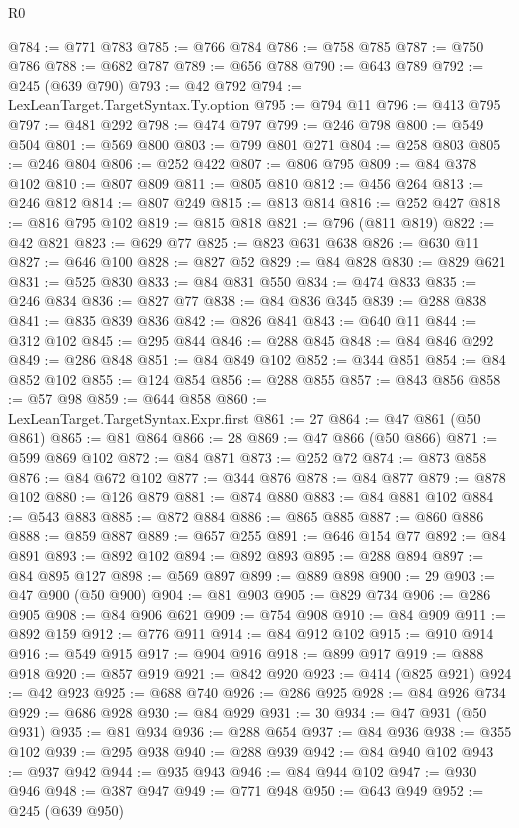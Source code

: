 \begin{lexlean}{R0}
\begin{coremodule}
@784 := @771 @783
@785 := @766 @784
@786 := @758 @785
@787 := @750 @786
@788 := @682 @787
@789 := @656 @788
@790 := @643 @789
@792 := @245 (@639 @790)
@793 := @42 @792
@794 := LexLeanTarget.TargetSyntax.Ty.option
@795 := @794 @11
@796 := @413 @795
@797 := @481 @292
@798 := @474 @797
@799 := @246 @798
@800 := @549 @504
@801 := @569 @800
@803 := @799 @801 @271
@804 := @258 @803
@805 := @246 @804
@806 := @252 @422
@807 := @806 @795
@809 := @84 @378 @102
@810 := @807 @809
@811 := @805 @810
@812 := @456 @264
@813 := @246 @812
@814 := @807 @249
@815 := @813 @814
@816 := @252 @427
@818 := @816 @795 @102
@819 := @815 @818
@821 := @796 (@811 @819)
@822 := @42 @821
@823 := @629 @77
@825 := @823 @631 @638
@826 := @630 @11
@827 := @646 @100
@828 := @827 @52
@829 := @84 @828
@830 := @829 @621
@831 := @525 @830
@833 := @84 @831 @550
@834 := @474 @833
@835 := @246 @834
@836 := @827 @77
@838 := @84 @836 @345
@839 := @288 @838
@841 := @835 @839 @836
@842 := @826 @841
@843 := @640 @11
@844 := @312 @102
@845 := @295 @844
@846 := @288 @845
@848 := @84 @846 @292
@849 := @286 @848
@851 := @84 @849 @102
@852 := @344 @851
@854 := @84 @852 @102
@855 := @124 @854
@856 := @288 @855
@857 := @843 @856
@858 := @57 @98
@859 := @644 @858
@860 := LexLeanTarget.TargetSyntax.Expr.first
@861 := 27
@864 := @47 @861 (@50 @861)
@865 := @81 @864
@866 := 28
@869 := @47 @866 (@50 @866)
@871 := @599 @869 @102
@872 := @84 @871
@873 := @252 @72
@874 := @873 @858
@876 := @84 @672 @102
@877 := @344 @876
@878 := @84 @877
@879 := @878 @102
@880 := @126 @879
@881 := @874 @880
@883 := @84 @881 @102
@884 := @543 @883
@885 := @872 @884
@886 := @865 @885
@887 := @860 @886
@888 := @859 @887
@889 := @657 @255
@891 := @646 @154 @77
@892 := @84 @891
@893 := @892 @102
@894 := @892 @893
@895 := @288 @894
@897 := @84 @895 @127
@898 := @569 @897
@899 := @889 @898
@900 := 29
@903 := @47 @900 (@50 @900)
@904 := @81 @903
@905 := @829 @734
@906 := @286 @905
@908 := @84 @906 @621
@909 := @754 @908
@910 := @84 @909
@911 := @892 @159
@912 := @776 @911
@914 := @84 @912 @102
@915 := @910 @914
@916 := @549 @915
@917 := @904 @916
@918 := @899 @917
@919 := @888 @918
@920 := @857 @919
@921 := @842 @920
@923 := @414 (@825 @921)
@924 := @42 @923
@925 := @688 @740
@926 := @286 @925
@928 := @84 @926 @734
@929 := @686 @928
@930 := @84 @929
@931 := 30
@934 := @47 @931 (@50 @931)
@935 := @81 @934
@936 := @288 @654
@937 := @84 @936
@938 := @355 @102
@939 := @295 @938
@940 := @288 @939
@942 := @84 @940 @102
@943 := @937 @942
@944 := @935 @943
@946 := @84 @944 @102
@947 := @930 @946
@948 := @387 @947
@949 := @771 @948
@950 := @643 @949
@952 := @245 (@639 @950)

\end{coremodule}
\end{lexlean}
